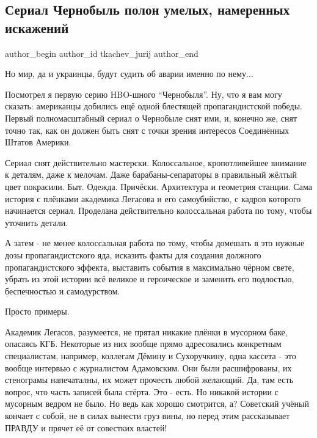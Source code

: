  
 
 
 
 
 
\subsection{Сериал Чернобыль полон умелых, намеренных искажений}
\label{sec:27_05_2019.1.serial_chernobyl}
 
\ifcmt
 author_begin
   author_id tkachev_jurij
 author_end
\fi

Но мир, да и украинцы, будут судить об аварии именно по нему...

Посмотрел я первую серию HBO-шного \enquote{Чернобыля}. Ну, что я вам могу сказать:
американцы добились ещё одной блестящей пропагандистской победы. Первый
полномасштабный сериал о Чернобыле снят ими, и, конечно же, снят точно так, как
он должен быть снят с точки зрения интересов Соединённых Штатов Америки.

Сериал снят действительно мастерски. Колоссальное, кропотливейшее внимание к
деталям, даже к мелочам. Даже барабаны-сепараторы в правильный жёлтый цвет
покрасили. Быт. Одежда. Причёски. Архитектура и геометрия станции. Сама история
с плёнками академика Легасова и его самоубийство, с кадров которого начинается
сериал. Проделана действительно колоссальная работа по тому, чтобы уточнить
детали.

А затем - не менее колоссальная работа по тому, чтобы домешать в это нужные
дозы пропагандистского яда, исказить факты для создания должного
пропагандистского эффекта, выставить события в максимально чёрном свете, убрать
из этой истории всё великое и героическое и заменить его подлостью,
беспечностью и самодурством.

Просто примеры.

Академик Легасов, разумеется, не прятал никакие плёнки в мусорном баке,
опасаясь КГБ. Некоторые из них вообще прямо адресовались конкретным
специалистам, например, коллегам Дёмину и Сухоручкину, одна кассета - это
вообще интервью с журналистом Адамовским. Они были расшифрованы, их стенограмы
напечаталны, их может прочесть любой желающий. Да, там есть вопрос, что часть
записей была стёрта. Это - есть. Но никакой истории с мусорным ведром не было.
Но ведь как хорошо смотрится, а? Советский учёный кончает с собой, не в силах
вынести груз вины, но перед этим рассказывает ПРАВДУ и прячет её от совестких
властей!


